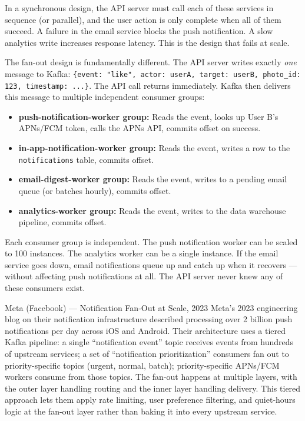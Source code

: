 \documentclass[11pt,a4paper]{article}
\begin{document}
In a synchronous design, the API server must call each of these services in sequence (or parallel), and the user action is only complete when all of them succeed. A failure in the email service blocks the push notification. A slow analytics write increases response latency. This is the design that fails at scale.

The fan-out design is fundamentally different. The API server writes exactly \textit{one} message to Kafka: \texttt{\{event: "like", actor: userA, target: userB, photo\_id: 123, timestamp: ...\}}. The API call returns immediately. Kafka then delivers this message to multiple independent consumer groups:

\begin{itemize}[leftmargin=1.5em, itemsep=3pt]
  \item \textbf{push-notification-worker group:} Reads the event, looks up User B's APNs/FCM token, calls the APNs API, commits offset on success.
  \item \textbf{in-app-notification-worker group:} Reads the event, writes a row to the \texttt{notifications} table, commits offset.
  \item \textbf{email-digest-worker group:} Reads the event, writes to a pending email queue (or batches hourly), commits offset.
  \item \textbf{analytics-worker group:} Reads the event, writes to the data warehouse pipeline, commits offset.
\end{itemize}

Each consumer group is independent. The push notification worker can be scaled to 100 instances. The analytics worker can be a single instance. If the email service goes down, email notifications queue up and catch up when it recovers --- without affecting push notifications at all. The API server never knew any of these consumers exist.

\begin{industrybox}{Meta (Facebook) --- Notification Fan-Out at Scale, 2023}
Meta's 2023 engineering blog on their notification infrastructure described processing over 2 billion push notifications per day across iOS and Android. Their architecture uses a tiered Kafka pipeline: a single ``notification event'' topic receives events from hundreds of upstream services; a set of ``notification prioritization'' consumers fan out to priority-specific topics (urgent, normal, batch); priority-specific APNs/FCM workers consume from those topics. The fan-out happens at multiple layers, with the outer layer handling routing and the inner layer handling delivery. This tiered approach lets them apply rate limiting, user preference filtering, and quiet-hours logic at the fan-out layer rather than baking it into every upstream service.
\end{industrybox}
\end{document}
